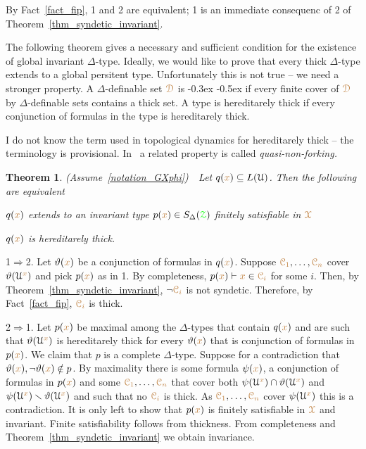 \documentclass[10pt,openany]{amsproc}
\makeatletter
\newcommand{\mylabel}[1]{{\ssf{#1}}\hfill}
\renewenvironment{itemize}
  {\begin{list}{}{%
   \setlength{\parskip}{0mm}
   \setlength{\topsep}{.2\baselineskip}
   \setlength{\rightmargin}{0mm}
   \setlength{\listparindent}{0mm}
   \setlength{\itemindent}{0mm}
   \setlength{\labelwidth}{2ex}
   \setlength{\itemsep}{.1\baselineskip}
   \setlength{\parsep}{0mm}
   \setlength{\partopsep}{0mm}
   \setlength{\labelsep}{1ex}
   \setlength{\leftmargin}{\labelwidth+\labelsep}
   \let\makelabel\mylabel
   }}
   {\vspace*{-.3\baselineskip}\end{list}}
\def\proves{\vdash}
\def\IMP{\Rightarrow}
\def\D{\EuScript D}
\def\X{\EuScript X}
\def\Z{\EuScript Z}
\def\C{\EuScript C}
\def\U{\EuScript U}
\def\theta{\vartheta}
\def\ssf#1{\textsf{\small #1}}
\newcounter{thm}
\theoremstyle{mio}
\newtheorem{theorem}[thm]{Theorem}\tcolorboxenvironment{theorem}{mythm}
\providecommand{\proofNameStyle}{\bfseries}
\renewenvironment{proof}[1][\proofname]{\par
  \pushQED{\qed}%
  \normalfont%
  \trivlist
  \item[\hskip\labelsep
        \proofNameStyle
    #1\@addpunct{.}]\ignorespaces
}{%
  \popQED\endtrivlist\@endpefalse
}
\def\mr{\color{brown}}
\def\gr{\color{green}}
\def\mrD{{\mr\D}}
\def\mrX{{\mr\X}}
\def\grZ{{\gr\Z}}
\renewcommand*{\emph}[1]{%
\kern-0.3ex
\smash{\tikz[baseline]\node[rectangle, fill=black!20!yellow!50!white, rounded corners, inner xsep=0.5ex, inner ysep=0.2ex, anchor=base, minimum height = 2.7ex]{#1};}\kern-0.5ex
}
\makeatother
\begin{document}
\begin{proof}
  By Fact~\ref{fact_fip}, \ssf1 and \ssf2 are equivalent; \ssf1 is an immediate consequenc of \ssf2 of Theorem~\ref{thm_syndetic_invariant}.
\end{proof}

The following theorem gives a necessary and sufficient condition for the  existence of global invariant $\Delta$-type.
Ideally, we would like to prove that every thick $\Delta$-type extends to a global persitent type.
Unfortunately this is not true -- we need a stronger property.
A $\Delta$-definable set $\mrD$ is \emph{hereditarely thick\/} if every finite cover of $\mrD$ by $\Delta$-definable sets contains a thick set.
A type is hereditarely thick if every conjunction of formulas in the type is hereditarely thick.

\noindent\llap{\textcolor{red}{\Large\warning}\kern1.5ex}\ignorespaces
I do not know the term used in topological dynamics for hereditarely thick -- the terminology is provisional.
In~\cite{CK} a related property is called \textit{quasi-non-forking.}

\begin{theorem}\label{thm_syndetic_invariant2}
  (Assume~\ref{notation_GXphi})\ \  
  Let $q({\mr x})\subseteq L(\U)$.
  Then the following are equivalent 
  \begin{itemize}
    \item[1.] $q({\mr x})$ extends to an invariant type $p({\mr x})\in S_\Delta(\grZ)$ finitely satisfiable in $\mrX$
    \item[2.] $q({\mr x})$ is hereditarely thick.
  \end{itemize}
\end{theorem}

\begin{proof}
  \ssf1$\IMP$\ssf2.
  Let $\theta({\mr x})$ be a conjunction of formulas in $q({\mr x})$.
  Suppose ${\mr\C_1},\dots,{\mr\C_n}$ cover $\theta(\U^{\mr x})$ and pick $p({\mr x})$ as in \ssf1.
  By completeness, $p({\mr x})\proves {\mr x}\in{\mr\C_i}$ for some $i$.
  Then, by Theorem~\ref{thm_syndetic_invariant}, $\neg{\mr\C_i}$ is not syndetic.
  Therefore, by Fact~\ref{fact_fip}, ${\mr\C_i}$ is thick.

  \ssf2$\IMP$\ssf1.
  Let $p({\mr x})$ be maximal among the $\Delta$-types that contain $q({\mr x})$ and are such that $\theta(\U^{\mr x})$ is hereditarely thick for every $\theta({\mr x})$ that is conjunction of formulas in $p({\mr x})$.
  We claim that $p$ is a complete $\Delta$-type.
  Suppose for a contradiction that $\theta({\mr x}),\neg\theta({\mr x})\notin p$.
  By maximality there is some formula $\psi({\mr x})$, a conjunction of formulas in $p({\mr x})$ and some ${\mr\C_1},\dots,{\mr\C_n}$ that cover both $\psi(\U^{\mr x})\cap\theta(\U^{\mr x})$ and $\psi(\U^{\mr x})\smallsetminus\theta(\U^{\mr x})$ and such that no ${\mr\C_i}$ is thick.
  As ${\mr\C_1},\dots,{\mr\C_n}$ cover $\psi(\U^{\mr x})$ this is a contradiction.
  It is only left to show that $p({\mr x})$ is finitely satisfiable in $\mrX$ and invariant.
  Finite satisfiability follows from thickness.
  From completeness and Theorem~\ref{thm_syndetic_invariant} we obtain invariance.
\end{proof}
\end{document}
